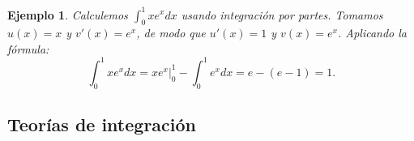 \documentclass[12pt, a4paper]{article}
\theoremstyle{rioplatense}
\newtheorem{ejemplo}{Ejemplo}[section]
\begin{document}
\begin{ejemplo}
    Calculemos $\int_0^1 x e^x  dx$ usando integración por partes. Tomamos $u(x) = x$ y $v'(x) = e^x$, de modo que $u'(x) = 1$ y $v(x) = e^x$. Aplicando la fórmula:
    $$
    \int_0^1 x e^x  dx = x e^x \Big|_0^1 - \int_0^1 e^x  dx = e - (e - 1) = 1.
    $$
\end{ejemplo}









\subsection{Teorías de integración} %
\end{document}
